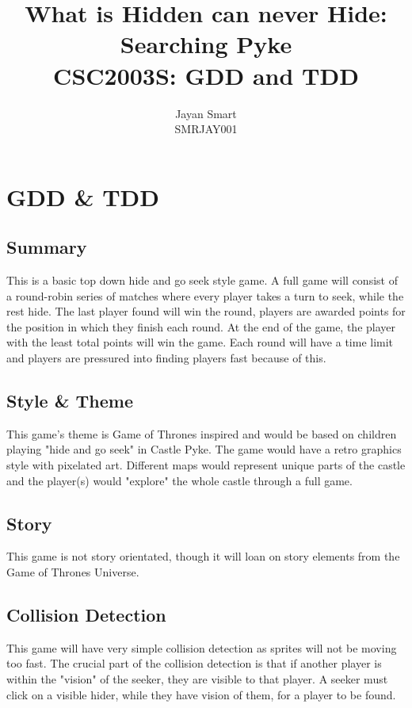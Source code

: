 \documentclass[]{report}
\title{What is Hidden can never Hide: Searching Pyke\\CSC2003S: GDD and TDD}
\author{Jayan Smart\\SMRJAY001}
\begin{document}
\maketitle

\tableofcontents

\chapter{GDD \& TDD}

\section{Summary}
This is a basic top down hide and go seek style game. A full game will consist of a round-robin series of matches where every player takes a turn to seek, while the rest hide. The last player found will win the round, players are awarded points for the position in which they finish each round. At the end of the game, the player with the least total points will win the game. Each round will have a time limit and players are pressured into finding players fast because of this.

\section{Style \& Theme}
This game's theme is Game of Thrones inspired and would be based on children playing "hide and go seek" in Castle Pyke. The game would have a retro graphics style with pixelated art. Different maps would represent unique parts of the castle and the player(s) would "explore" the whole castle through a full game.

\section{Story}
This game is not story orientated, though it will loan on story elements from the Game of Thrones Universe.

\section{Collision Detection}
This game will have very simple collision detection as sprites will not be moving too fast. The crucial part of the collision detection is that if another player is within the "vision" of the seeker, they are visible to that player. A seeker must click on a visible hider, while they have vision of them, for a player to be found.
\end{document}
